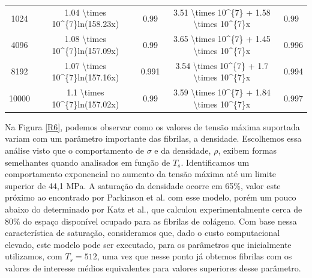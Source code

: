 \documentclass{article}
\begin{document}
\begin{table}[H]
\begin{tabular}{ccccl}
        1024             & 1.04 \textbackslash{}times 10\textasciicircum{}\{7\}ln(158.23x) & 0.99                              & 3.51 \textbackslash{}times 10\textasciicircum{}\{7\} + 1.58 \textbackslash{}times 10\textasciicircum{}\{7\}x & 0.99                     \\
        4096             & 1.08 \textbackslash{}times 10\textasciicircum{}\{7\}ln(157.09x) & 0.99                              & 3.65 \textbackslash{}times 10\textasciicircum{}\{7\} + 1.45 \textbackslash{}times 10\textasciicircum{}\{7\}x & 0.996                    \\
        8192             & 1.07 \textbackslash{}times 10\textasciicircum{}\{7\}ln(157.16x) & 0.991                             & 3.54 \textbackslash{}times 10\textasciicircum{}\{7\} + 1.7 \textbackslash{}times 10\textasciicircum{}\{7\}x  & 0.994                    \\
        10000            & 1.1 \textbackslash{}times 10\textasciicircum{}\{7\}ln(157.02x)  & 0.99                              & 3.59 \textbackslash{}times 10\textasciicircum{}\{7\} + 1.84 \textbackslash{}times 10\textasciicircum{}\{7\}x & 0.997                    \\ \hline
        \end{tabular}
        \label{tab2}
    \end{table}


    Na Figura \ref{R6}, podemos observar como os valores de tensão máxima suportada variam com um parâmetro 
    importante das fibrilas, a densidade. Escolhemos essa análise visto que o comportamento de \(\sigma\) e da 
    densidade, \(\rho\), exibem formas semelhantes quando analisados em função de \(T_{s}\). Identificamos um 
    comportamento exponencial no aumento da tensão máxima até um limite superior de 44,1 MPa. A saturação da 
    densidade ocorre em 65\%, valor este próximo ao encontrado por Parkinson et al.\cite{Parkinson1995} com esse 
    modelo, porém um pouco abaixo do determinado por Katz et al.\cite{KATZ1973351}, que calculou experimentalmente 
    cerca de 80\% do espaço disponível ocupado para as fibrilas de colágeno. Com base nessa característica de 
    saturação, consideramos que, dado o custo computacional elevado, este modelo pode ser executado, para os parâmetros 
    que inicialmente utilizamos, com \(T_{s}=512\), uma vez que nesse ponto já obtemos fibrilas com os valores de 
    interesse médios equivalentes para valores superiores desse parâmetro. 
\end{document}
